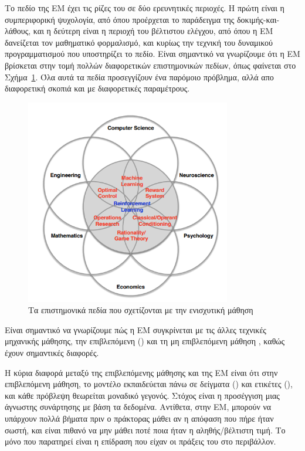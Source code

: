 Το πεδίο της ΕΜ έχει τις ρίζες του σε δύο ερευνητικές περιοχές. Η πρώτη είναι η συμπεριφορική ψυχολογία, από όπου προέρχεται το
παράδειγμα της δοκιμής-και-λάθους, και η δεύτερη είναι η περιοχή του βέλτιστου ελέγχου, από όπου η ΕΜ δανείζεται
τον μαθηματικό φορμαλισμό, και κυρίως την τεχνική του δυναμικού προγραμματισμού που υποστηρίζει το πεδίο. Είναι σημαντικό να γνωρίζουμε ότι η ΕΜ
βρίσκεται στην τομή πολλών διαφορετικών επιστημονικών πεδίων, όπως φαίνεται στο Σχήμα~\ref{fig:faces_rl}\cite{silver2015}.
Όλα αυτά τα πεδία προσεγγίζουν ένα παρόμοιο πρόβλημα, αλλά απο διαφορετική σκοπιά και με διαφορετικές παραμέτρους.

\begin{figure}
    \includegraphics[width=0.8\textwidth]{body_matter/reinforcement_learning/images/faces_of_rl.png}
    \Centering
    \caption{Τα επιστημονικά πεδία που σχετίζονται με την ενισχυτική μάθηση \cite{silver2015}}
    \label{fig:faces_rl}
\end{figure}

Είναι σημαντικό να γνωρίζουμε πώς η ΕΜ συγκρίνεται με τις άλλες τεχνικές μηχανικής μάθησης,
την επιβλεπόμενη () και τη μη επιβλεπόμενη μάθηση , καθώς
έχουν σημαντικές διαφορές.

Η κύρια διαφορά μεταξύ της επιβλεπόμενης μάθησης και της ΕΜ είναι ότι στην επιβλεπόμενη
μάθηση, το μοντέλο εκπαιδεύεται πάνω σε δείγματα () και ετικέτες (), και κάθε πρόβλεψη θεωρείται
μοναδικό γεγονός. Στόχος είναι η προσέγγιση μιας άγνωστης συνάρτησης με βάση τα δεδομένα.
Αντίθετα, στην ΕΜ, μπορούν να υπάρχουν πολλά βήματα πριν ο πράκτορας μάθει αν η απόφαση που πήρε ήταν
σωστή, και είναι πιθανό να μην μάθει ποτέ ποια ήταν η αληθής/βέλτιστη τιμή. Το μόνο που παρατηρεί είναι η
επίδραση που είχαν οι πράξεις του στο περιβάλλον.

